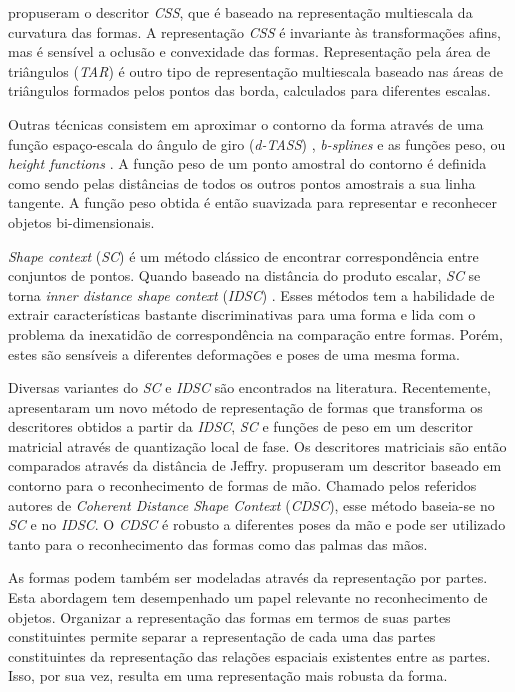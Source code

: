  propuseram o descritor \textit{CSS}, que é baseado na representação multiescala da curvatura das formas. A representação \textit{CSS} é invariante às transformações afins, mas é sensível a oclusão e convexidade das formas. Representação pela área de triângulos (\textit{TAR}) \cite{Alajlan20117} é outro tipo de representação multiescala baseado nas áreas de triângulos formados pelos pontos das borda, calculados para diferentes escalas. 

Outras técnicas consistem em aproximar o contorno da forma através de uma função espaço-escala do ângulo de giro (\textit{d-TASS}) \cite{4202050}, \textit{b-splines} \cite{1168520} e as funções peso, ou \textit{height functions} \cite{Wang2012134}. A função peso de um ponto amostral do contorno é definida como sendo pelas distâncias de todos os outros pontos amostrais a sua linha tangente. A função peso obtida é então suavizada para representar e reconhecer objetos bi-dimensionais.

\textit{Shape context} (\textit{SC}) \cite{Belongie:2002} é um método clássico de encontrar correspondência entre conjuntos de pontos. Quando baseado na distância do produto escalar, \textit{SC} se torna \textit{inner distance shape context} (\textit{IDSC}) \cite{1467513}. Esses métodos tem a habilidade de extrair características bastante discriminativas para uma forma e lida com o problema da inexatidão de correspondência na comparação entre formas. Porém, estes são sensíveis a diferentes deformações e poses de uma mesma forma.

Diversas variantes do \textit{SC} e \textit{IDSC} são encontrados na literatura. Recentemente,  apresentaram um novo método de representação de formas que transforma os descritores obtidos a partir da \textit{IDSC}, \textit{SC} e funções de peso em um descritor matricial através de quantização local de fase. Os descritores matriciais são então comparados através da distância de Jeffry.  propuseram um descritor baseado em contorno para o reconhecimento de formas de mão. Chamado pelos referidos autores de \textit{Coherent Distance Shape Context} (\textit{CDSC}), esse método baseia-se no \textit{SC} e no \textit{IDSC}. O \textit{CDSC} é robusto a diferentes poses da mão e pode ser utilizado tanto para o reconhecimento das formas como das palmas das mãos.  

As formas podem também ser modeladas através da representação por partes. Esta abordagem tem desempenhado um papel relevante no reconhecimento de objetos. Organizar a representação das formas em termos de suas partes constituintes permite separar a representação de cada uma das partes constituintes da representação das relações espaciais existentes entre as partes. Isso, por sua vez, resulta em uma representação mais robusta da forma. 

